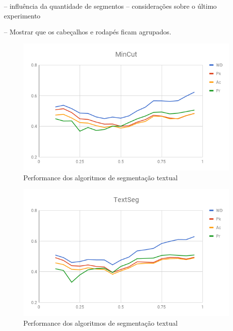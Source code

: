 
-- influência da quantidade de segmentos
-- considerações sobre o último experimento




-- Mostrar que os cabeçalhos e rodapés ficam agrupados.





  \begin{figure}[!h]
	  \centering
	  \includegraphics[width=1\textwidth]{conteudo/capitulos/figs/graficos/analiseNSegRate-MinCut.png}
	  \caption{Performance dos algoritmos de segmentação textual}
	  \label{fig:grafico-medidas-tradicionais}
  \end{figure}


  \begin{figure}[!h]
	  \centering
	  \includegraphics[width=1\textwidth]{conteudo/capitulos/figs/graficos/analiseNSegRate-UISeg.png}
	  \caption{Performance dos algoritmos de segmentação textual}
	  \label{fig:grafico-medidas-tradicionais}
  \end{figure}

